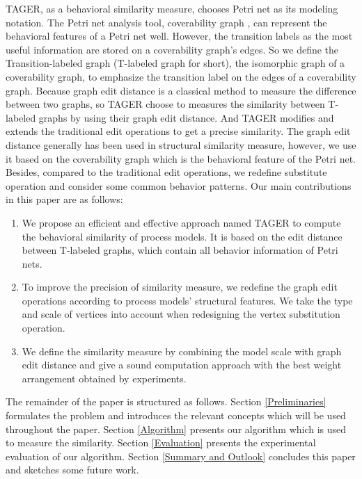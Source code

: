 \documentclass{llncs}
\begin{document}
TAGER, as a behavioral similarity measure, chooses Petri net as its modeling notation. The Petri net analysis tool, coverability graph \cite{verbeek2004verification}, can represent the behavioral features of a Petri net well. However, the transition labels as the most useful information are stored on a coverability graph's edges. So we define the Transition-labeled graph (T-labeled graph for short), the isomorphic graph of a coverability graph, to emphasize the transition label on the edges of a coverability graph. Because graph edit distance is a classical method to measure the difference between two graphs, so TAGER choose to measures the similarity between T-labeled graphs by using their graph edit distance. And TAGER  modifies and extends the traditional edit operations to get a precise similarity.
The graph edit distance generally has been used in structural similarity measure, however, we use it based on the coverability graph which is the behavioral feature of the Petri net. Besides, compared to the traditional edit operations, we redefine substitute operation and consider some common behavior patterns.
Our main contributions in this paper are as follows:
\begin{enumerate}

\item We propose an efficient and effective approach named TAGER to compute the behavioral similarity of process models. It is based on the edit distance between T-labeled graphs, which contain all behavior information of Petri nets.
\item To improve the precision of similarity measure, we redefine the graph edit operations \cite{messmer1995efficient} according to process models' structural features. We take the type and scale of vertices into account when redesigning the vertex substitution operation.
\item We define the similarity measure by combining the model scale with graph edit distance and give a sound computation approach with the best weight arrangement obtained by experiments.
\end{enumerate}

The remainder of the paper is structured as follows.
Section \ref{Preliminaries} formulates the problem and introduces the relevant concepts which will be used throughout the paper.
Section \ref{Algorithm} presents our algorithm which is used to measure the similarity.
Section \ref{Evaluation} presents the experimental evaluation of our algorithm.
Section \ref{Summary and Outlook} concludes this paper and sketches some future work.
\end{document}
